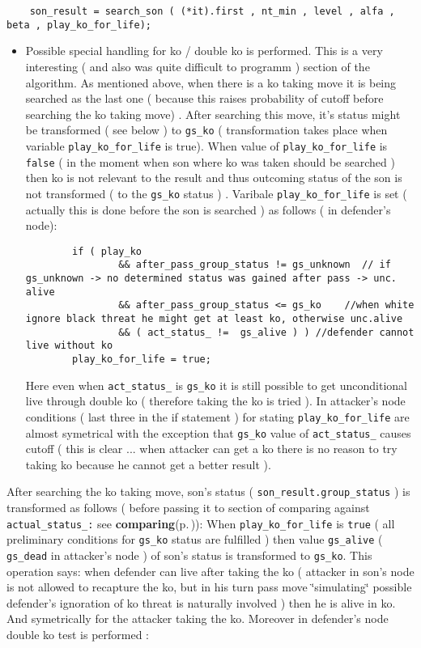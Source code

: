 \footnotesize\begin{verbatim}    son_result = search_son ( (*it).first , nt_min , level , alfa , beta , play_ko_for_life);  
\end{verbatim}
\normalsize
\begin{itemize}
\item Possible special handling for ko / double ko is performed. This is a very interesting ( and also was quite difficult to programm ) section of the algorithm. As mentioned above, when there is a ko taking move it is being searched as the last one ( because this raises probability of cutoff before searching the ko taking move) . After searching this move, it's status might be transformed ( see below ) to {\tt gs\_\-ko} ( transformation takes place when variable {\tt play\_\-ko\_\-for\_\-life} is true). When value of {\tt play\_\-ko\_\-for\_\-life} is {\tt false} ( in the moment when son where ko was taken should be searched ) then ko is not relevant to the result and thus outcoming status of the son is not transformed ( to the {\tt gs\_\-ko} status ) . Varibale {\tt play\_\-ko\_\-for\_\-life} is set ( actually this is done before the son is searched ) as follows ( in defender's node): 

\footnotesize\begin{verbatim}        if ( play_ko 
                && after_pass_group_status != gs_unknown  // if gs_unknown -> no determined status was gained after pass -> unc. alive
                && after_pass_group_status <= gs_ko    //when white ignore black threat he might get at least ko, otherwise unc.alive  
                && ( act_status_ !=  gs_alive ) ) //defender cannot live without ko 
        play_ko_for_life = true;
\end{verbatim}
\normalsize
 Here even when {\tt act\_\-status\_\-} is {\tt gs\_\-ko} it is still possible to get unconditional live through double ko ( therefore taking the ko is tried ). In attacker's node conditions ( last three in the if statement ) for stating {\tt play\_\-ko\_\-for\_\-life} are almost symetrical with the exception that {\tt gs\_\-ko} value of {\tt act\_\-status\_\-} causes cutoff ( this is clear ... when attacker can get a ko there is no reason to try taking ko because he cannot get a better result ).\end{itemize}


After searching the ko taking move, son's status ( {\tt son\_\-result.group\_\-status} ) is transformed as follows ( before passing it to section of comparing against {\tt actual\_\-status\_\-:} see {\bf comparing}{\rm (p.\,\pageref{page_3_node_comparing})}): When {\tt play\_\-ko\_\-for\_\-life} is {\tt true} ( all preliminary conditions for {\tt gs\_\-ko} status are fulfilled ) then value {\tt gs\_\-alive} ( {\tt gs\_\-dead} in attacker's node ) of son's status is transformed to {\tt gs\_\-ko}. This operation says: when defender can live after taking the ko ( attacker in son's node is not allowed to recapture the ko, but in his turn pass move \char`\"{}simulating\char`\"{} possible defender's ignoration of ko threat is naturally involved ) then he is alive in ko. And symetrically for the attacker taking the ko. Moreover in defender's node double ko test is performed :



